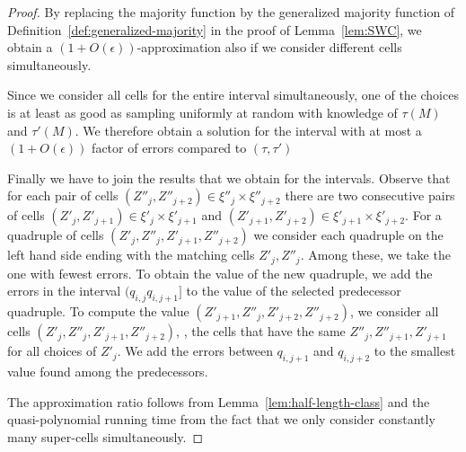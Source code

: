 \begin{proof}
    By replacing the majority function by the generalized majority function of Definition~\ref{def:generalized-majority} in the proof of Lemma~\ref{lem:SWC}, we obtain a $(1 + O(\epsilon))$-approximation
    also if we consider different cells simultaneously.

    Since we consider all cells for the entire interval simultaneously, one of the choices is at least as good as sampling uniformly at random with knowledge of $\tau(M)$ and $\tau'(M)$.
    We therefore obtain a solution for the interval with at most a $(1+O(\epsilon))$ factor of errors compared to $(\tau,\tau')$

    Finally we have to join the results that we obtain for the intervals.
    Observe that for each pair of cells $(Z''_j,Z''_{j+2}) \in \xi''_j \times \xi''_{j+2}$ there are two consecutive pairs of cells
    $(Z'_j,Z'_{j+1}) \in \xi'_j \times \xi'_{j+1}$ and $(Z'_{j+1}, Z'_{j+2}) \in \xi'_{j+1} \times \xi'_{j+2}$.
    For a quadruple of cells $(Z'_j,Z''_j,Z'_{j+1},Z''_{j+2})$ we consider each quadruple on the left hand side ending with the matching cells $Z'_j,Z''_j$.
    Among these, we take the one with fewest errors.
    To obtain the value of the new quadruple, we add the errors in the interval $(q_{i,j} q_{i,j+1}]$ to the value of the selected predecessor quadruple.
    To compute the value $(Z'_{j+1},Z''_j,Z'_{j+2},Z''_{j+2})$, we consider all cells $(Z'_j,Z''_j,Z'_{j+1},Z''_{j+2})$, \ie, the cells that have the same $Z''_{j},Z''_{j+1},Z'_{j+1}$ for all choices of $Z'_j$.
    We add the errors between $q_{i,j+1}$ and $q_{i,j+2}$ to the smallest value found among the predecessors.

    The approximation ratio follows from Lemma~\ref{lem:half-length-class} and the quasi-polynomial running time from the fact that we only consider constantly many super-cells simultaneously.

\end{proof}

